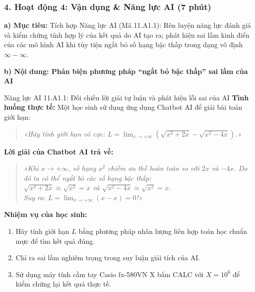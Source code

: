 \documentclass[12pt, a4paper]{article}
\begin{document}
\subsubsection*{4. Hoạt động 4: Vận dụng \& Năng lực AI (7 phút)}

\noindent \textbf{a) Mục tiêu:}
Tích hợp Năng lực AI (Mã 11.A1.1): Rèn luyện năng lực đánh giá và kiểm chứng tính hợp lý của kết quả do AI tạo ra; phát hiện sai lầm kinh điển của các mô hình AI khi tùy tiện ngắt bỏ số hạng bậc thấp trong dạng vô định $\infty - \infty$.

\noindent \textbf{b) Nội dung: Phản biện phương pháp ``ngắt bỏ bậc thấp'' sai lầm của AI}

\begin{aibox}{Năng lực AI 11.A1.1: Đối chiếu lời giải tự luận và phát hiện lỗi sai của AI}
\textbf{Tình huống thực tế:} Một học sinh sử dụng ứng dụng Chatbot AI để giải bài toán giới hạn:
\begin{quote}
\textit{«Hãy tính giới hạn vô cực: $L = \lim_{x \to +\infty} \left(\sqrt{x^2 + 2x} - \sqrt{x^2 - 4x}\right)$.»}
\end{quote}
\textbf{Lời giải của Chatbot AI trả về:}
\begin{quote}
\textit{«Khi $x \to +\infty$, số hạng $x^2$ chiếm ưu thế hoàn toàn so với $2x$ và $-4x$. Do đó ta có thể ngắt bỏ các số hạng bậc thấp:\\
$\sqrt{x^2 + 2x} \approx \sqrt{x^2} = x$ và $\sqrt{x^2 - 4x} \approx \sqrt{x^2} = x$.\\
Suy ra: $L = \lim_{x \to +\infty} (x - x) = 0$!»}
\end{quote}
\textbf{Nhiệm vụ của học sinh:}
\begin{enumerate}[leftmargin=0.6cm]
    \item Hãy tính giới hạn $L$ bằng phương pháp nhân lượng liên hợp toán học chuẩn mực để tìm kết quả đúng.
    \item Chỉ ra sai lầm nghiêm trọng trong suy luận giải tích của AI.
    \item Sử dụng máy tính cầm tay Casio fx-580VN X bấm CALC với $X = 10^6$ để kiểm chứng lại kết quả thực tế.
\end{enumerate}
\end{aibox}
\end{document}
